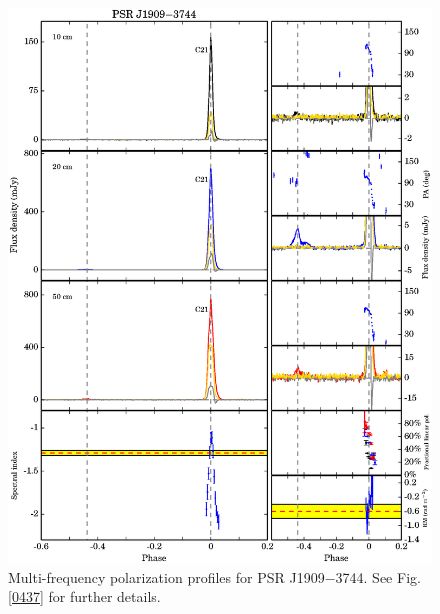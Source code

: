 \documentclass[useAMS,usenatbib]{mn2e}
\begin{document}
\begin{appendices}
\begin{figure}
\begin{center}
\includegraphics[width=6 in]{1909.ps}
\caption{Multi-frequency polarization profiles for PSR J1909$-$3744. 
See Fig. \ref{0437} for further details.}
\label{1909}
\end{center}
\end{figure}


\end{appendices}
\end{document}
